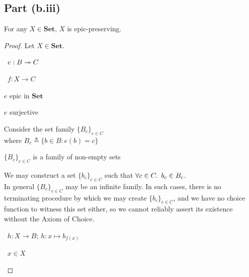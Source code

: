 \subsection{Part (b.iii)}\label{sec:q-1-b-iii}

\begin{prop}\label{prop:set-epic-preserving}
  For any $X\in\mathbf{Set}$, $X$ is epic-preserving.

  \begin{proof}
    Let $X\in\mathbf{Set}$.
    \begin{itemize}
      \step
        \begin{itemize}
          \subp{\star}
            \Let~$e : B\twoheadrightarrow C$

          \step\Let~$f : X\to C$
            \marginnote{\Hyp}

            \step $e$ epic in $\mathbf{Set}$

            \step[\iffs] $e$ surjective

            \addtolength{\itemsep}{.5\baselineskip}
            \step
              Consider the set family $\{B_c\}_{c\in C}$\\
              where $B_c \triangleq \{b\in B : e(b) = c\}$

            \step
              $\{B_c\}_{c\in C}$ is a family of non-empty sets

            \addtolength{\itemsep}{-.5\baselineskip}
            \step[\imps]
              We may construct a set $\{b_c\}_{c\in C}$ such that $\forall c\in C\ldotp~b_c\in B_c$.
              \\[1\baselineskip]
              In general $\{B_c\}_{c\in C}$ may be an infinite family. In such cases, there is no terminating procedure by which we may create $\{b_c\}_{c\in C}$, and we have no choice function to witness this set either, so we cannot reliably assert its existence without the Axiom of Choice.

            \addtolength{\itemsep}{+1\baselineskip}
            \step
              \Let~$h : X \to B;~h : x \mapsto b_{f(x)}$
            \addtolength{\itemsep}{-1\baselineskip}

          \step
              \begin{itemize}
                \subp{\dagger}
                  \Let~$x\in X$
                  \marginnote{\Hyp}


\end{itemize}
\end{itemize}
\end{itemize}
\end{proof}
\end{prop}
